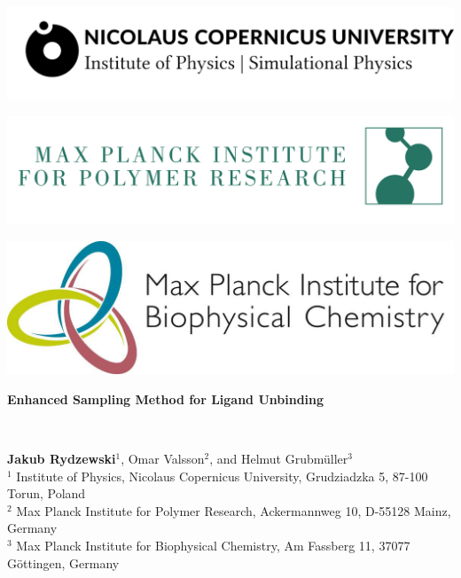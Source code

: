 \documentclass[a0,portrait]{a0poster}
\begin{document}
\begin{minipage}[b]{0.3\linewidth}
\centering
\includegraphics[width=25cm]{../fig/umk.png}
\end{minipage}\hspace*{4cm}
\begin{minipage}[b]{0.3\linewidth}
\centering
\includegraphics[width=23cm]{../fig/mpip.png}
\end{minipage}\hspace*{3cm}
\begin{minipage}[b]{0.3\linewidth}
\centering
\includegraphics[width=16cm]{../fig/helmut.jpg}
\end{minipage}

\vspace{1cm}

\begin{minipage}[b]{\linewidth}
\veryHuge\centering\color{myblue} 
\begin{minipage}[b]{\linewidth}
\textbf{Enhanced Sampling Method for Ligand Unbinding}
  \end{minipage}
\end{minipage}
\color{Black}\\[1cm]
\begin{minipage}[b]{\linewidth}
  \huge \textbf{Jakub Rydzewski$^1$}, Omar Valsson$^2$, and Helmut
  Grubm\"{u}ller$^3$\\[1cm]
\large $^1$ Institute of Physics, Nicolaus Copernicus University,
  Grudziadzka 5, 87-100 Torun, Poland\\
\large $^2$ Max Planck Institute for Polymer Research, Ackermannweg 10,
  D-55128 Mainz, Germany\\
\large $^3$ Max Planck Institute for Biophysical Chemistry, Am Fassberg 11,
  37077 Göttingen, Germany\\
\end{minipage}
\end{document}
